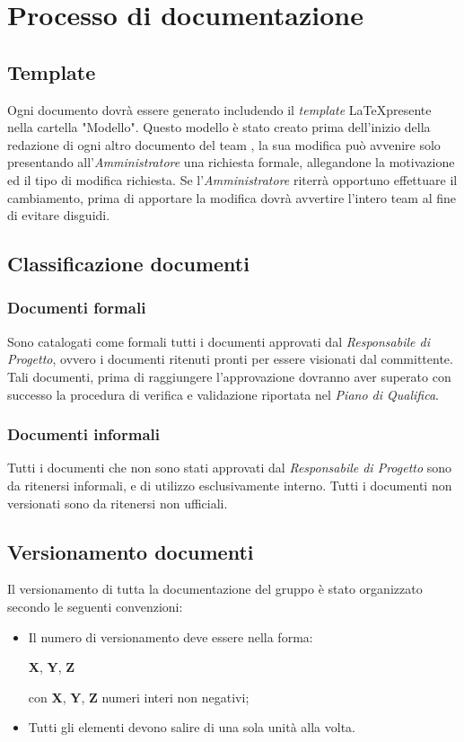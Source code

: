 \section{Processo di documentazione}
\subsection{Template}
Ogni documento dovrà essere generato includendo il \textit{template} \LaTeX presente nella cartella "Modello".
Questo modello è stato creato prima dell'inizio della redazione di ogni altro documento del team \gruppo{}, la sua modifica può avvenire solo presentando all'\textit{Amministratore} una richiesta formale, allegandone la motivazione ed il tipo di modifica richiesta. Se l'\textit{Amministratore} riterrà opportuno effettuare il cambiamento, prima di apportare la modifica dovrà avvertire l'intero team al fine di evitare disguidi.

\subsection{Classificazione documenti}
\subsubsection{Documenti formali}
Sono catalogati come formali tutti i documenti approvati dal \textit{Responsabile di Progetto}, ovvero i documenti ritenuti pronti per essere visionati dal committente. Tali documenti, prima di raggiungere l'approvazione dovranno aver superato con successo la procedura di verifica e validazione riportata nel \textit{Piano di Qualifica}.
\subsubsection{Documenti informali}
Tutti i documenti che non sono stati approvati dal \textit{Responsabile di Progetto} sono da ritenersi informali, e di utilizzo esclusivamente interno. Tutti i documenti non versionati sono da ritenersi non ufficiali.

\subsection{Versionamento documenti}
Il versionamento di tutta la documentazione del gruppo \gruppo{} è stato organizzato secondo le seguenti convenzioni:
\begin{itemize}
\item Il numero di versionamento deve essere nella forma:

\begin{center}
\textbf{X}, \textbf{Y}, \textbf{Z}
\end{center}

con \textbf{X}, \textbf{Y}, \textbf{Z} numeri interi non negativi;
\item Tutti gli elementi devono salire di una sola unità alla volta.
\end{itemize}

